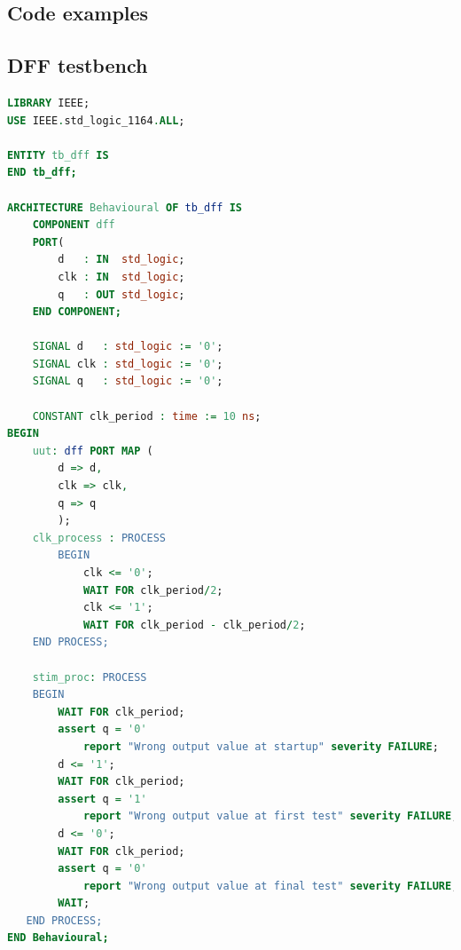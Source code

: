 \documentclass[11pt,british]{article}
\newcommand\blankpage{%
    \null
    \thispagestyle{empty}%
    \addtocounter{page}{-1}%
    \newpage}
\begin{document}
\begin{appendices}

\section{Code examples}
\subsection{DFF testbench}
\label{app:dfftestbench}
\begin{lstlisting}[language=VHDL, tabsize=4, frame=single, framesep=2mm, belowskip=4pt, aboveskip=4pt, showstringspaces=false, basicstyle=\footnotesize]
LIBRARY IEEE;
USE IEEE.std_logic_1164.ALL;

ENTITY tb_dff IS
END tb_dff;

ARCHITECTURE Behavioural OF tb_dff IS
	COMPONENT dff
    PORT(
		d 	: IN  std_logic;
        clk : IN  std_logic;
		q 	: OUT std_logic;
    END COMPONENT;
    
	SIGNAL d   : std_logic := '0';
	SIGNAL clk : std_logic := '0';
	SIGNAL q   : std_logic := '0';

	CONSTANT clk_period : time := 10 ns;
BEGIN
	uut: dff PORT MAP (
        d => d,
        clk => clk,
		q => q
        );
	clk_process : PROCESS
		BEGIN
			clk <= '0';
			WAIT FOR clk_period/2;
			clk <= '1';
			WAIT FOR clk_period - clk_period/2;
	END PROCESS;
	
	stim_proc: PROCESS
	BEGIN		
     	WAIT FOR clk_period;
     	assert q = '0'
			report "Wrong output value at startup" severity FAILURE;
		d <= '1';
     	WAIT FOR clk_period;
     	assert q = '1'
			report "Wrong output value at first test" severity FAILURE;
		d <= '0';
     	WAIT FOR clk_period;
     	assert q = '0'
			report "Wrong output value at final test" severity FAILURE;
		WAIT;
   END PROCESS;
END Behavioural;
\end{lstlisting}

\end{appendices}


%


\afterpage{\blankpage}
\end{document}
